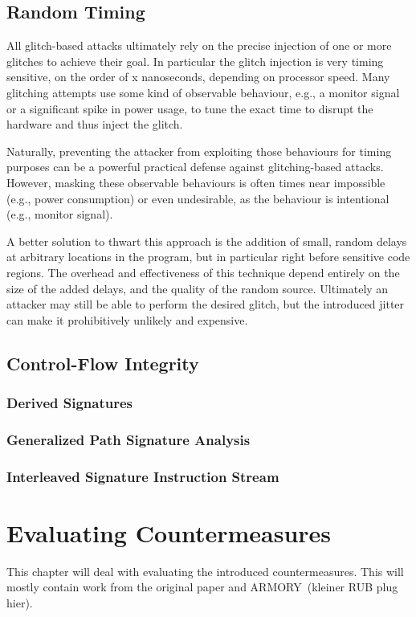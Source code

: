 \section{Random Timing}
All glitch-based attacks ultimately rely on the precise injection of one or more glitches to achieve their goal.  In particular the glitch injection is very timing sensitive, on the order of x nanoseconds, depending on processor speed. Many glitching attempts use some kind of observable behaviour, e.g., a monitor signal or a significant spike in power usage, to tune the exact time to disrupt the hardware and thus inject the glitch.

Naturally, preventing the attacker from exploiting those behaviours for timing purposes can be a powerful practical defense against glitching-based attacks. However, masking these observable behaviours is often times near impossible (e.g., power consumption) or even undesirable, as the behaviour is intentional (e.g., monitor signal).

A better solution to thwart this approach is the addition of small, random delays at arbitrary locations in the program, but in particular right before sensitive code regions. The overhead and effectiveness of this technique depend entirely on the size of the added delays, and the quality of the random source. Ultimately an attacker may still be able to perform the desired glitch, but the introduced jitter can make it prohibitively unlikely and expensive. 

\section{Control-Flow Integrity}
\subsection{Derived Signatures}
\subsection{Generalized Path Signature Analysis}
\subsection{Interleaved Signature Instruction Stream}

\chapter{Evaluating Countermeasures}
This chapter will deal with evaluating the introduced countermeasures. This will mostly contain work from the original paper and ARMORY\,\cite{9206547} (kleiner RUB plug hier).


